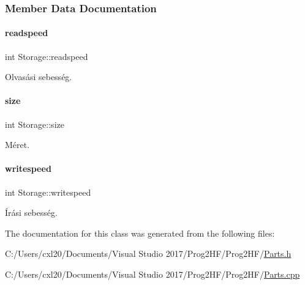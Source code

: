 \subsubsection{Member Data Documentation}
\mbox{\label{class_storage_a41073842ff16961dad3903e6dd49bb0c}} 
\paragraph{\texorpdfstring{readspeed}{readspeed}}
{\footnotesize\ttfamily int Storage\+::readspeed\hspace{0.3cm}{\ttfamily [protected]}}



Olvasási sebesség. 

\mbox{\label{class_storage_abcc80ce58a21fa884035617ee0b6cb67}} 
\paragraph{\texorpdfstring{size}{size}}
{\footnotesize\ttfamily int Storage\+::size\hspace{0.3cm}{\ttfamily [protected]}}



Méret. 

\mbox{\label{class_storage_a0198a1483ccf849d48c76da88599ba8b}} 
\paragraph{\texorpdfstring{writespeed}{writespeed}}
{\footnotesize\ttfamily int Storage\+::writespeed\hspace{0.3cm}{\ttfamily [protected]}}



Írási sebesség. 



The documentation for this class was generated from the following files\+:\begin{DoxyCompactItemize}
\item 
C\+:/\+Users/cxl20/\+Documents/\+Visual Studio 2017/\+Prog2\+H\+F/\+Prog2\+H\+F/\mbox{\hyperlink{_parts_8h}{Parts.\+h}}\item 
C\+:/\+Users/cxl20/\+Documents/\+Visual Studio 2017/\+Prog2\+H\+F/\+Prog2\+H\+F/\mbox{\hyperlink{_parts_8cpp}{Parts.\+cpp}}\end{DoxyCompactItemize}
